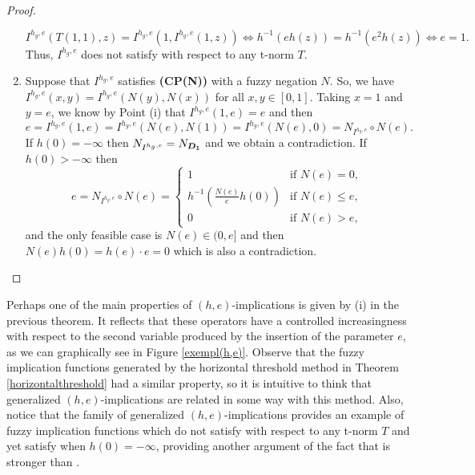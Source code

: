 \begin{proof}
\begin{enumerate}[label=(\roman*)]
		$$I^{h_g,e}(T(1,1),z)= I^{h_g,e}(1,I^{h_g,e}(1,z)) \Leftrightarrow h^{-1} (eh(z))=h^{-1} (e^2h(z)) \Leftrightarrow e=1.$$
		Thus, $I^{h_g,e}$ does not satisfy \LI with respect to any t-norm $T$.
		\item Suppose that $I^{h_g,e}$ satisfies {\bf (CP(N))} with a fuzzy negation $N$. So, we have $I^{h_g,e}(x,y)=I^{h_g,e}(N(y),N(x))$ for all $x,y \in [0,1]$. Taking $x=1$ and $y=e$, we know by Point (i) that $I^{h_g,e}(1,e)=e$ and then 
		$$e=I^{h_g,e}(1,e)=I^{h_g,e}(N(e),N(1))=I^{h_g,e}(N(e),0)=N_{I^{h_g,e}}\circ N(e).$$ 
		If $h(0)=-\infty$ then $N_{I^{h_g,e}}=N_{\bm{D_1}}$ and we obtain a contradiction. If $h(0) > - \infty$ then 
		$$e= N_{I^{h_g,e}}\circ N(e) =
		\left\{ \begin{array}{ll}
			1 & \text{if } N(e)=0, \\
			h^{-1}\left(\frac{N(e)}{e}h(0)\right) &   \text{if } N(e)\leq e, \\
			0 &   \text{if } N(e)>e, 
		\end{array}
		\right.
		$$
		and the only feasible case is $N(e) \in (0,e]$ and then $N(e)h(0)=h(e) \cdot e=0$ which is also a contradiction.
	\end{enumerate}
\end{proof}

Perhaps one of the main properties of $(h,e)$-implications is given by (i) in the previous theorem. It reflects that these operators have a controlled increasingness with respect to the second variable produced by the insertion of the parameter $e$, as we can graphically see in Figure \ref{exempl(h,e)}. Observe that the fuzzy implication functions generated by the horizontal threshold method in Theorem \ref{horizontalthreshold} had a similar property, so it is intuitive to think that generalized $(h,e)$-implications are related in some way with this method. Also, notice that the family of generalized $(h,e)$-implications provides an example of fuzzy implication functions which do not satisfy \LI with respect to any t-norm $T$ and yet satisfy \EP when $h(0)=-\infty$, providing another argument of the fact that \LI is stronger than \EP \cite{Massanet2011B}.

